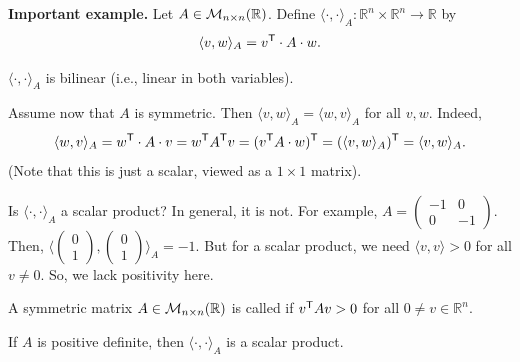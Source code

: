 \noindent\textbf{Important example.} Let $A \in \mathcal{M}_{n \times n}(\mathbb{R})$. Define $\langle \cdot, \cdot \rangle_A : \mathbb{R}^n \times \mathbb{R}^n \to \mathbb{R}$ by
\[
    \langle v, w \rangle_A = v^{\mathsf{T}} \cdot A \cdot w.
\]

\begin{exercise}
    \label{exc:bilinear_form_A}
    $\langle \cdot, \cdot \rangle_A$ is bilinear (i.e., linear in both variables).
\end{exercise}

Assume now that $A$ is symmetric. Then $\langle v, w \rangle_A = \langle w, v \rangle_A$ for all $v, w$. Indeed,
\[
    \langle w, v \rangle_A = w^{\mathsf{T}} \cdot A \cdot v = w^{\mathsf{T}} A^{\mathsf{T}} v = (v^{\mathsf{T}} A \cdot w)^{\mathsf{T}} = (\langle v, w \rangle_A)^{\mathsf{T}} = \langle v, w \rangle_A.
\]
(Note that this is just a scalar, viewed as a $1 \times 1$ matrix). 

Is $\langle \cdot, \cdot \rangle_A$ a scalar product? In general, it is not. For example, $A = \left(\begin{smallmatrix} -1 & 0 \\ 0 & -1 \end{smallmatrix}\right)$. Then, $\langle \left(\begin{smallmatrix} 0 \\ 1 \end{smallmatrix}\right), \left(\begin{smallmatrix} 0 \\ 1 \end{smallmatrix}\right) \rangle_A = -1$. But for a scalar product, we need $\langle v, v \rangle > 0$ for all $v \neq 0$. So, we lack positivity here.

\begin{definition}
\label{def:positive_definite_matrix_real}
    A symmetric matrix $A \in \mathcal{M}_{n \times n}(\mathbb{R})$ is called  if $v^{\mathsf{T}} A v > 0$ for all $0 \neq v \in \mathbb{R}^n$.
\end{definition}

\begin{exercise}
    \label{exc:pos_def_gives_scalar_product}
    If $A$ is positive definite, then $\langle \cdot, \cdot \rangle_A$ is a scalar product.
\end{exercise}


